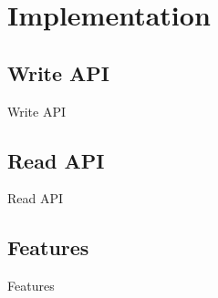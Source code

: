 %
%

\chapter{Implementation}
\label{cha:implementation}

\section{Write API}
Write API

\section{Read API}
Read API

\section{Features}
Features